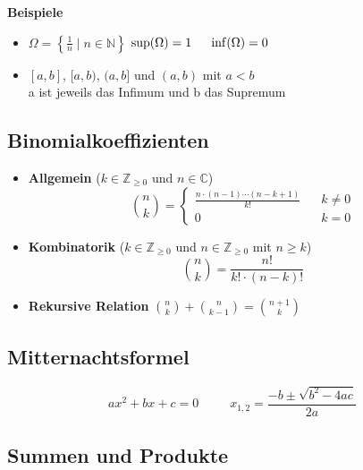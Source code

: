 \documentclass[8pt, a4paper, landscape, fleqn]{scrartcl}
\newenvironment {example}
				{\begin{itshape} \begin{small}}
				{\end{small} \end{itshape}}
\newenvironment {eq}
				{\begin{equation*}}
				{\end{equation*}}
\begin{document}
\begin{multicols*}{3}
				 \begin{example}
				 	\textbf{Beispiele}
				 	\begin{itemize}
				 		\item $\Omega = \left\{\frac{1}{n}\mid n\in \mathbb{N}\right\}$ \hspace{0.5cm}
				 		$\sup(\Omega) = 1 \hspace{0.5cm} \inf(\Omega) = 0$
				 		\item$[a, b]$, $[a, b)$, $(a, b]$ und $(a, b)$ mit $a<b$\\
				 		a ist jeweils das Infimum und b das Supremum	
				 	\end{itemize}
				\end{example}
			 \subsection{Binomialkoeffizienten}
				 \label{sec:binomial}
				 \begin{itemize}
				 	\item \textbf{Allgemein} ($k \in \mathbb{Z}_{\ge 0}$ und  $n \in \mathbb{C}$)
				 	\begin{equation*}
					 	\binom{n}{k}=
					 	\begin{cases}
						 	\frac{n \cdot (n-1)\cdots (n-k+1)}{k!} \hspace{10pt} &k\ne 0\\
						 	0 &k=0
					 	\end{cases}
				 	\end{equation*}
				 	\item \textbf{Kombinatorik} ($k \in \mathbb{Z}_{\ge 0}$ und $n \in \mathbb{Z}_{\ge 0}$ mit $n \ge k$)
				 	\begin{equation*}
				 		\binom{n}{k}=\frac{n!}{k!\cdot(n-k)!}
				 	\end{equation*}
				 	\item \textbf{Rekursive Relation }$\binom{n}{k} + \binom{n}{k-1} = \binom{n+1}{k}$
				 \end{itemize}	
			\subsection{Mitternachtsformel}
				 \label{sec:mitternachtsformel}
				 \begin{eq}
				 	ax^2+bx+c=0  \hspace{30pt} x_{1,2}=\frac{-b \pm \sqrt{b^2-4ac}}{2a} 
				 \end{eq}
			\subsection{Summen und Produkte}

\end{multicols*}
\end{document}
